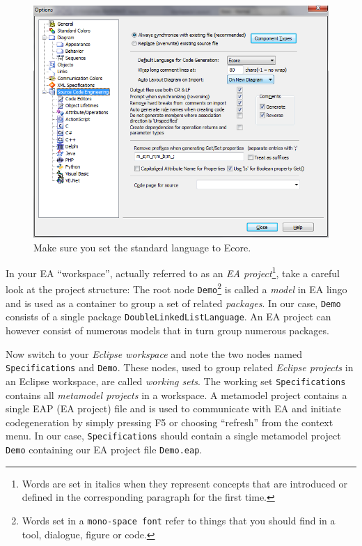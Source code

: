 \begin{figure}[!h]
\begin{minipage}[b]{0.3\textheight}
  \label{fig_standardAppearanceEA}
\end{minipage}
\\
\vspace{0.5cm}
\begin{minipage}[b]{0.3\textheight}
  \centering
  \includegraphics[width=\textwidth]{pics/standardCodeEngineering}
  \caption{Make sure you set the standard language to Ecore.}
  \label{fig_standardSCEEA}
\end{minipage}
\end{figure}

In your EA ``workspace'', actually referred to as an \emph{EA
project}\footnote{Words are set in italics when they represent concepts that are
introduced or defined  in the corresponding paragraph for the first time.}, take
a careful  look at the project structure:  The root node
\texttt{Demo}\footnote{Words set  in a \texttt{mono-space font} refer to things
that you should find in a tool,  dialogue, figure or code.} is called a
\emph{model} in EA lingo and is used as a  container to group a set of related
\emph{packages}. In our case, \texttt{Demo}  consists of a single package
\texttt{DoubleLinkedListLanguage}.  An EA project can however consist of
numerous models that in turn group  numerous packages.


Now switch to your \emph{Eclipse workspace} and note the two nodes named
\texttt{Spe\-ci\-fi\-ca\-tions} and \texttt{Demo}.  These nodes, used to group
related \emph{Eclipse projects} in an Eclipse workspace, are called
\emph{working sets}. The working set \texttt{Spe\-ci\-fi\-ca\-tions} contains
all \emph{metamodel projects} in a  workspace.
 A metamodel project contains a single EAP (EA project) file and is
used to communicate with EA and initiate codegeneration by simply pressing F5
or choosing ``refresh'' from the context menu.  In our case,
\texttt{Specifications} should contain a single metamodel project \texttt{Demo}
containing our EA project file  \texttt{Demo.eap}.

